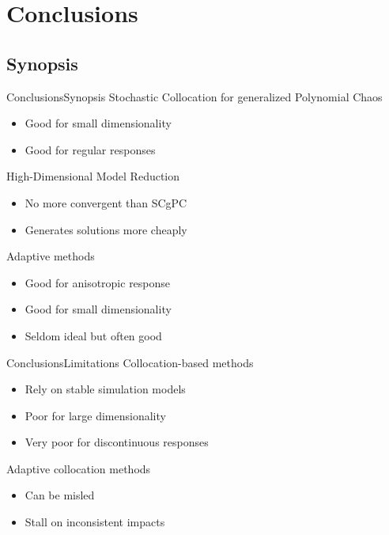 \documentclass{beamer}
\begin{document}
\section{Conclusions}
\subsection{Synopsis}
\begin{frame}{Conclusions}{Synopsis}%
  \vfill
  Stochastic Collocation for generalized Polynomial Chaos
  \begin{itemize}
    \item Good for small dimensionality
    \item Good for regular responses
  \end{itemize}
  \vfill
  High-Dimensional Model Reduction
  \begin{itemize}
    \item No more convergent than SCgPC
    \item Generates solutions more cheaply
  \end{itemize}
  \vfill
  Adaptive methods
  \begin{itemize}
    \item Good for anisotropic response
    \item Good for small dimensionality
    \item Seldom ideal but often good
  \end{itemize}
  \vfill
\end{frame}

\begin{frame}{Conclusions}{Limitations}\vspace{-20pt}
  \vfill
  Collocation-based methods
  \begin{itemize}
    \item Rely on stable simulation models
    \item Poor for large dimensionality
    \item Very poor for discontinuous responses
  \end{itemize}
  \vfill
  Adaptive collocation methods
  \begin{itemize}
    \item Can be misled
    \item Stall on inconsistent impacts
  \end{itemize}
  \vfill
\end{frame}
\end{document}
